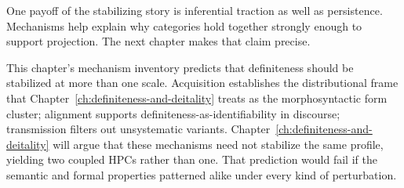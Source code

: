 One payoff of the stabilizing story is inferential traction as well as persistence. Mechanisms help explain why categories hold together strongly enough to support projection. The next chapter makes that claim precise.

\begin{definitenessthread}
This chapter's mechanism inventory predicts that definiteness should be stabilized at more than one scale. Acquisition establishes the distributional frame that Chapter~\ref{ch:definiteness-and-deitality} treats as the morphosyntactic form cluster; alignment supports definiteness-as-identifiability in discourse; transmission filters out unsystematic variants. Chapter~\ref{ch:definiteness-and-deitality} will argue that these mechanisms need not stabilize the same profile, yielding two coupled HPCs rather than one. That prediction would fail if the semantic and formal properties patterned alike under every kind of perturbation.
\end{definitenessthread}
